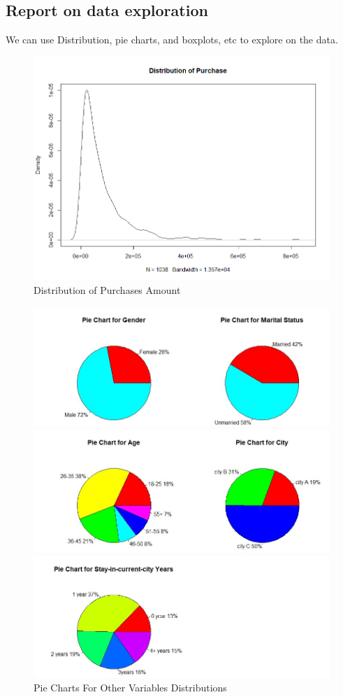 \documentclass{zjureport}
\begin{document}
\subsection{Report on  data exploration}
We can use Distribution, pie charts, and boxplots, etc to explore on the data.

\begin{figure}[!ht]
	\centering
	\includegraphics[width=.8\textwidth,height=.5\textwidth]{Rplot11.png}
	\caption{Distribution of Purchases Amount}
\end{figure}

\begin{figure}[H]
	\centering
	\includegraphics[width=1\textwidth]{Rplot04.jpg}

	\centering
	\includegraphics[width=1\textwidth]{Rplot05.jpg}

	\centering
	\includegraphics[width=1\textwidth]{Rplot06.jpg}
	\caption{Pie Charts For Other Variables Distributions}
\end{figure}
\end{document}
